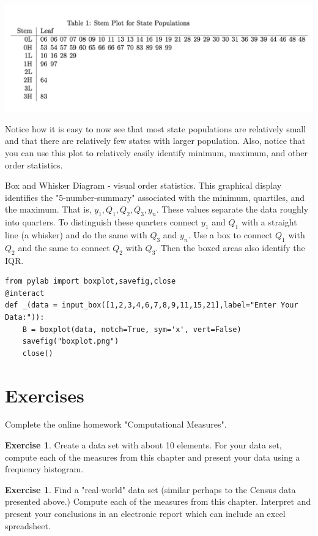 \documentclass[10pt,]{book}
\theoremstyle{plain}
\theoremstyle{definition}
\theoremstyle{definition}
\theoremstyle{definition}
\newtheorem{exercise}[theorem]{Exercise}
\numberwithin{equation}{section}
\begin{document}
	
\includegraphics[width=1\linewidth]{images/stemandleaf.png}


Notice how it is easy to now see that most state populations are relatively small and that there are relatively few states with larger population. Also, notice that you can use this plot to relatively easily identify minimum, maximum, and other order statistics.		
		
\par
Box and Whisker Diagram - visual order statistics. This graphical display identifies the "5-number-summary" associated with the minimum, quartiles, and the maximum. That is, \(y_1, Q_1, Q_2, Q_3, y_n\).  These values separate the data roughly into quarters. To distinguish these quarters connect \(y_1\) and \(Q_1\) with a straight line (a whisker) and do the same with \(Q_3\) and \(y_n\). Use a box to connect \(Q_1\) with \(Q_2\) and the same to connect \(Q_2\) with \(Q_3\). Then the boxed areas also identify the IQR.    
\begin{lstlisting}[style=sageinput]
from pylab import boxplot,savefig,close
@interact
def _(data = input_box([1,2,3,4,6,7,8,9,11,15,21],label="Enter Your Data:")):
    B = boxplot(data, notch=True, sym='x', vert=False)
    savefig("boxplot.png")
    close()
\end{lstlisting}

\typeout{************************************************}
\typeout{************************************************}
\section[{Exercises}]{Exercises}\label{section-9}
Complete the online homework "Computational Measures".%
\begin{exercise}\label{exercise-3}
Create a data set with about 10 elements. For your data set, compute each of the measures from this chapter and present your data using a frequency histogram.%
\end{exercise}
\begin{exercise}\label{exercise-4}
Find a "real-world" data set (similar perhaps to the Census data presented above.) Compute each of the measures from this chapter. Interpret and present your conclusions in an electronic report which can include an excel spreadsheet.%
\end{exercise}
\typeout{************************************************}
\typeout{************************************************}
\end{document}
